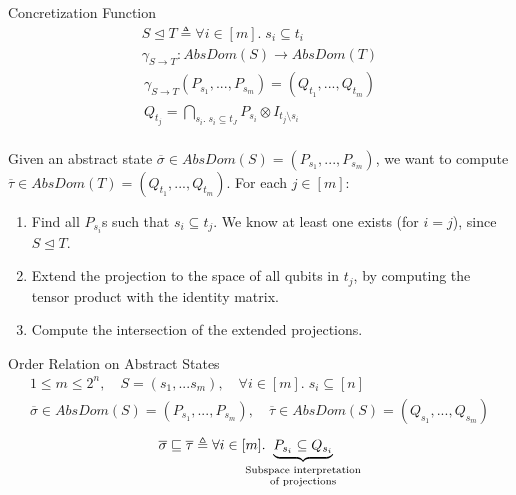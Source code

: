 \documentclass[11pt,svgnames,smaller,aspectratio=43,english]{beamer}
\makeatletter
\newcommand{\tensor}{\otimes}
\newcommand{\bunder}[2]{\underbrace{#1}_{\text{\scriptsize\tabular[t]{@{}c@{}}#2\endtabular}}}
\makeatother
\begin{document}
\begin{frame}{Concretization Function}
	\vspace*{-2em}
	\begin{gather*}
		S \trianglelefteq T \triangleq \forall i \in [m].\; s_i \subseteq t_i\\
		\gamma_{S \rightarrow T}: \mathit{AbsDom}(S) \rightarrow \mathit{AbsDom}(T)
	\end{gather*}
	\vspace*{-2em}
	\begin{gather*}
		\gamma_{S \rightarrow T}(P_{s_1}, ..., P_{s_m}) = (Q_{t_1}, ..., Q_{t_{m}})\\
		Q_{t_j} = \bigcap_{s_i.\; s_i \subseteq t_J} P_{s_i} \tensor I_{t_j \setminus s_i}
	\end{gather*}
	\\\vspace*{1em}
	Given an abstract state $\overline{\sigma} \in \mathit{AbsDom}(S) = (P_{s_1}, ..., P_{s_m})$, we want to compute $\overline{\tau} \in \mathit{AbsDom}(T) = (Q_{t_1}, ..., Q_{t_m})$. For each $j\in [m]$:
	\begin{enumerate}
		\item Find all $P_{s_i}$s such that $s_i \subseteq t_j$. We know at least one exists (for $i=j$), since $S \trianglelefteq T$.
		\item Extend the projection to the space of all qubits in $t_j$, by computing the tensor product with the identity matrix.
		\item Compute the intersection of the extended projections.
	\end{enumerate}
\end{frame}

\begin{frame}{Order Relation on Abstract States}
	\begin{gather*}
		1 \leq m \leq 2^n,\quad S = (s_1, ... s_m),\quad \forall i \in [m].\; s_i \subseteq [n]\\
		\overline{\sigma} \in \mathit{AbsDom}(S) = (P_{s_1}, ..., P_{s_m}),\quad \overline{\tau} \in \mathit{AbsDom}(S) = (Q_{s_1}, ..., Q_{s_m})
	\end{gather*}
	\begin{gather*}
		\overline{\sigma} \sqsubseteq \overline{\tau} \triangleq \forall i \in [m].\; \hspace*{-1.9em}\bunder{P_{s_i} \subseteq Q_{s_i}}{Subspace interpretation\\of projections}
	\end{gather*}
\end{frame}
\end{document}
